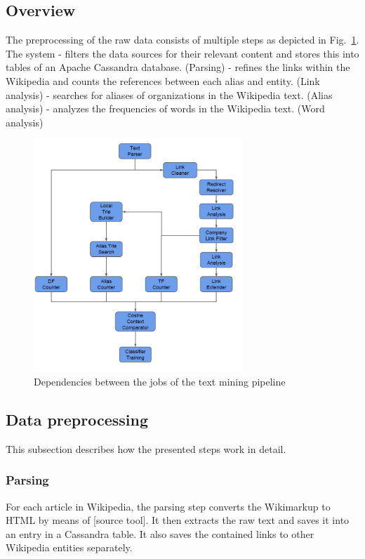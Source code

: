 \subsection{Overview}
The preprocessing of the raw data consists of multiple steps as depicted in Fig.~\ref{fig:job_dependencies}. The system
- filters the data sources for their relevant content and stores this into tables of an Apache Cassandra database. (Parsing)
- refines the links within the Wikipedia and counts the references between each alias and entity. (Link analysis)
- searches for aliases of organizations in the Wikipedia text. (Alias analysis) 
- analyzes the frequencies of words in the Wikipedia text. (Word analysis)

\begin{figure}[ht]
	\centering
  \includegraphics[width=0.7\textwidth]{Graphics/job_dependencies.png}
	\caption{Dependencies between the jobs of the text mining pipeline}
	\label{fig:job_dependencies}
\end{figure}


\subsection{Data preprocessing}
This subsection describes how the presented steps work in detail.

\subsubsection{Parsing}
For each article in Wikipedia, the parsing step converts the Wikimarkup to HTML by means of [source tool]. It then extracts the raw text and saves it into an entry in a Cassandra table. It also saves the contained links to other Wikipedia entities separately.

